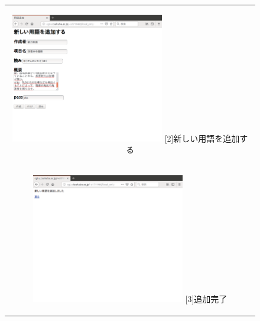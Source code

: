 \documentclass[12pt,a4paper]{jarticle}
\begin{document}
\begin{ttfamily}
\begin{figure}[htbp]
\begin{center}
\begin{tabular}{c}
      \begin{minipage}{0.55\hsize}
        \begin{center}
          \includegraphics[width=6.7cm]{10-3-8.eps}
          \hspace{1.6cm} [2]新しい用語を追加する
        \end{center}
      \end{minipage}

      \begin{minipage}{0.55\hsize}
        \vspace{30mm}
      \end{minipage} \\
 
      \begin{minipage}{0.5\hsize}
        \begin{center}
          \includegraphics[width=6.7cm]{10-3-9.eps}
          \hspace{1.6cm} [3]追加完了
        \end{center}
      \end{minipage}


\end{tabular}
\end{center}
\end{figure}
\end{ttfamily}
\end{document}
